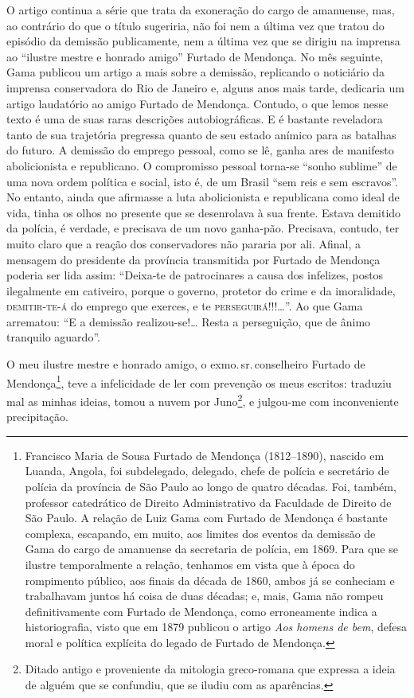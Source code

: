 \begin{didascalia}
O artigo continua a série que trata da exoneração do cargo de amanuense,
mas, ao contrário do que o título sugeriria, não foi nem a última vez
que tratou do episódio da demissão publicamente, nem a última vez que se
dirigiu na imprensa ao ``ilustre mestre e honrado amigo'' Furtado de
Mendonça. No mês seguinte, Gama publicou um artigo a mais sobre a
demissão, replicando o noticiário da imprensa conservadora do Rio de
Janeiro e, alguns anos mais tarde, dedicaria um artigo laudatório ao
amigo Furtado de Mendonça. Contudo, o que lemos nesse texto é uma de
suas raras descrições autobiográficas. E é bastante reveladora tanto de
sua trajetória pregressa quanto de seu estado anímico para as batalhas
do futuro. A demissão do emprego pessoal, como se lê, ganha ares de
manifesto abolicionista e republicano. O compromisso pessoal torna-se
``sonho sublime'' de uma nova ordem política e social, isto é, de um
Brasil ``sem reis e sem escravos''. No entanto, ainda que afirmasse a luta
abolicionista e republicana como ideal de vida, tinha os olhos no
presente que se desenrolava à sua frente. Estava demitido da polícia, é
verdade, e precisava de um novo ganha-pão. Precisava, contudo, ter muito
claro que a reação dos conservadores não pararia por ali. Afinal, a
mensagem do presidente da província transmitida por Furtado de Mendonça
poderia ser lida assim: ``Deixa-te de patrocinares a causa dos infelizes,
postos ilegalmente em cativeiro, porque o governo, protetor do crime e
da imoralidade, \textsc{demitir-te-á} do emprego que exerces, e te
\textsc{perseguirá}!!!\ldots{}''. Ao que Gama arrematou: ``E a demissão realizou-se!\ldots{}
Resta a perseguição, que de ânimo tranquilo aguardo''.
\end{didascalia}



O meu ilustre mestre e honrado amigo, o exmo.\,sr.\,conselheiro Furtado de
Mendonça\footnote{Francisco Maria de Sousa Furtado de Mendonça
  (1812--1890), nascido em Luanda, Angola, foi subdelegado, delegado,
  chefe de polícia e secretário de polícia da província de São Paulo ao
  longo de quatro décadas. Foi, também, professor catedrático de Direito
  Administrativo da Faculdade de Direito de São Paulo. A relação de Luiz
  Gama com Furtado de Mendonça é bastante complexa, escapando, em muito,
  aos limites dos eventos da demissão de Gama do cargo de amanuense da
  secretaria de polícia, em 1869. Para que se ilustre temporalmente a
  relação, tenhamos em vista que à época do rompimento público, aos
  finais da década de 1860, ambos já se conheciam e trabalhavam juntos
  há coisa de duas décadas; e, mais, Gama não rompeu definitivamente com
  Furtado de Mendonça, como erroneamente indica a historiografia, visto
  que em 1879 publicou o artigo \emph{Aos homens de bem}, defesa moral e
  política explícita do legado de Furtado de Mendonça.}, teve a
infelicidade de ler com prevenção os meus escritos: traduziu mal as
minhas ideias, tomou a nuvem por Juno\footnote{Ditado antigo e
  proveniente da mitologia greco-romana que expressa a ideia de alguém
  que se confundiu, que se iludiu com as aparências.}, e julgou-me com
inconveniente precipitação.

